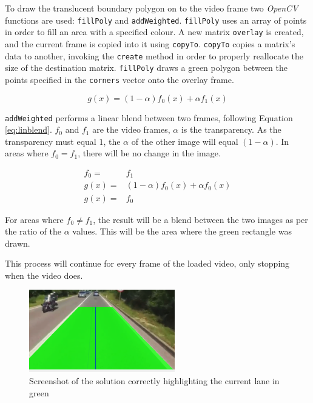 \documentclass[conference]{IEEEtran}
\begin{document}
To draw the translucent boundary polygon on to the video frame two \textit{OpenCV} functions are used: \verb|fillPoly| and \verb|addWeighted|. \verb|fillPoly| uses an array of points in order to fill an area with a specified colour\cite{fillPoly}. A new matrix \verb|overlay| is created, and the current frame is copied into it using \verb|copyTo|. \verb|copyTo| copies a matrix's data to another, invoking the \verb|create| method in order to properly reallocate the size of the destination matrix\cite{copyTo}. \verb|fillPoly| draws a green polygon between the points specified in the \verb|corners| vector onto the overlay frame.

\begin{equation}\label{eq:linblend}
g(x) = (1-\alpha)f_0(x)+\alpha f_1 (x)
\end{equation}

\verb|addWeighted| performs a linear blend between two frames, following Equation \ref{eq:linblend}. $f_0$ and $f_1$ are the video frames, $\alpha$ is the transparency. As the transparency must equal $1$, the $\alpha$ of the other image will equal $(1-\alpha)$. In areas where $f_0 = f_1$, there will be no change in the image.

\begin{equation}\label{xx}
\begin{split}
f_0=& f_1\\
g(x)=&(1-\alpha)f_0(x)+\alpha f_0 (x) \\
g(x)=& f_0 
\end{split}
\end{equation}

For areas where $f_0 \neq f_1$, the result will be a blend between the two images as per the ratio of the $\alpha$ values. This will be the area where the green rectangle was drawn.

This process will continue for every frame of the loaded video, only stopping when the video does.

\begin{figure}[H]
\centering
\includegraphics[width=2.5in]{video1_screenshot}
\caption{Screenshot of the solution correctly highlighting the current lane in green}
\label{fig:t5working}
\end{figure}
\end{document}
